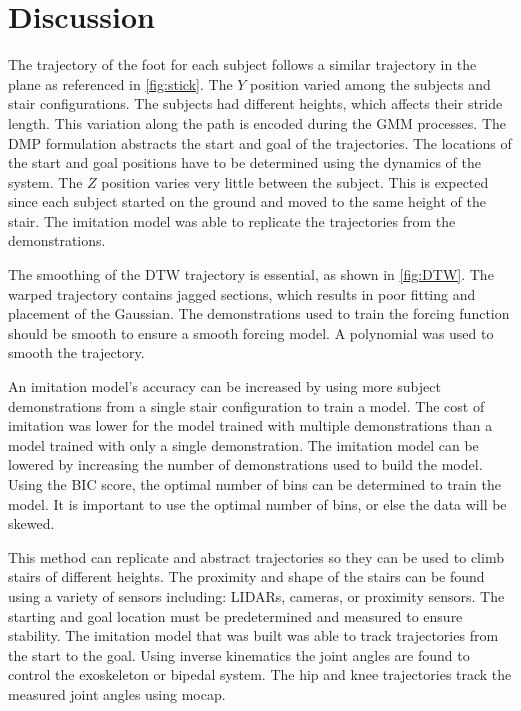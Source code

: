 \section{Discussion} 
The trajectory of the foot for each subject follows a similar trajectory in the plane as referenced in \autoref{fig:stick}. The $Y$ position varied among the subjects and stair configurations. The subjects had different heights, which affects their stride length. This variation along the path is encoded during the GMM processes. The DMP formulation abstracts the start and goal of the trajectories. The locations of the start and goal positions have to be determined using the dynamics of the system. The $Z$ position varies very little between the subject. This is expected since each subject started on the ground and moved to the same height of the stair. The imitation model was able to replicate the trajectories from the demonstrations. 

The smoothing of the DTW trajectory is essential, as shown in \autoref{fig:DTW}. The warped trajectory contains jagged sections, which results in poor fitting and placement of the Gaussian. The demonstrations used to train the forcing function should be smooth to ensure a smooth forcing model. A polynomial was used to smooth the trajectory. 


An imitation model's accuracy can be increased by using more subject demonstrations from a single stair configuration to train a model. The cost of imitation was lower for the model trained with multiple demonstrations than a model trained with only a single demonstration. The imitation model can be lowered by increasing the number of demonstrations used to build the model. Using the BIC score, the optimal number of bins can be determined to train the model. It is important to use the optimal number of bins, or else the data will be skewed.  

This method can replicate and abstract trajectories so they can be used to climb stairs of different heights. The proximity and shape of the stairs can be found using a variety of sensors including: LIDARs, cameras, or proximity sensors. The starting and goal location must be predetermined and measured to ensure stability. The imitation model that was built was able to track trajectories from the start to the goal. Using inverse kinematics the joint angles are found to control the exoskeleton or bipedal system. The hip and knee trajectories track the measured joint angles using mocap. 


